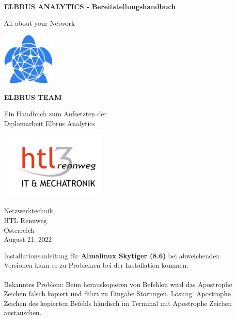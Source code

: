 \documentclass{article}
\begin{document}
	\begin{titlepage}
		\begin{center}
			\vspace*{1cm}
			
			\textbf{ELBRUS ANALYTICS - Bereitstellungshandbuch}
			
			\vspace{0.5cm}
			All about your Network
			
			\vspace{0.4cm}
			
			\includegraphics[width=0.2\textwidth]{logo.png}
			
			\vspace{0.6cm}
			\textbf{ELBRUS TEAM}
			
			\vfill
			
			Ein Handbuch zum Aufsetzten der \\
			Diplomarbeit Elbrus Analytics
			
			\vspace{0.8cm}
			
			\includegraphics[width=0.4\textwidth]{htl.png}
			
			Netzwerktechnik\\
			HTL Rennweg\\
			Österreich \\
			August 21, 2022
			
		\end{center}
	\end{titlepage}
	\newpage
	Installationsanleitung für \textbf{Almalinux Skytiger (8.6)} bei abweichenden Versionen kann es zu Problemen bei der Installation kommen. \\ \\
	Bekanntes Problem: Beim herauskopieren von Befehlen wird das Apostrophe Zeichen falsch kopiert und führt zu Eingabe Störungen. Lösung: Apostrophe Zeichen des kopierten Befehls händisch im Terminal mit Apostrophe Zeichen austauschen. 
	
\end{document}
